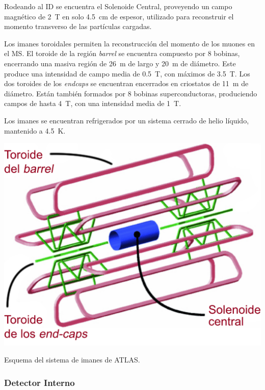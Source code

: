 Rodeando al ID se encuentra el Solenoide Central, proveyendo un campo magnético de \SI{2}{\tesla} en solo \SI{4.5}{\centi\meter} de espesor, utilizado para reconstruir el momento transverso de las partículas cargadas.

Los imanes toroidales permiten la reconstrucción del momento de los muones en el MS. El toroide de la región \textit{barrel} se encuentra compuesto por 8 bobinas, encerrando una masiva región de \SI{26}{\meter} de largo y \SI{20}{\meter} de diámetro. Este produce una intensidad de campo media de \SI{0.5}{\tesla}, con máximos de \SI{3.5}{\tesla}. Los dos toroides de los \textit{endcaps} se encuentran encerrados en criostatos de \SI{11}{\meter} de diámetro. Están también formados por 8 bobinas superconductoras, produciendo campos de hasta \SI{4}{\tesla}, con una intensidad media de \SI{1}{\tesla}.

Los imanes se encuentran refrigerados por un sistema cerrado de helio líquido, mantenido a \SI{4.5}{\kelvin}.

\begin{marginfigure}
    \includegraphics[width=\linewidth]{Assets/Images/ATLAS_magnets.pdf}
    \caption{Esquema del sistema de imanes de ATLAS.}
    \label{fig:ch2:atlas_magnets}
\end{marginfigure}

\subsubsection{Detector Interno}

